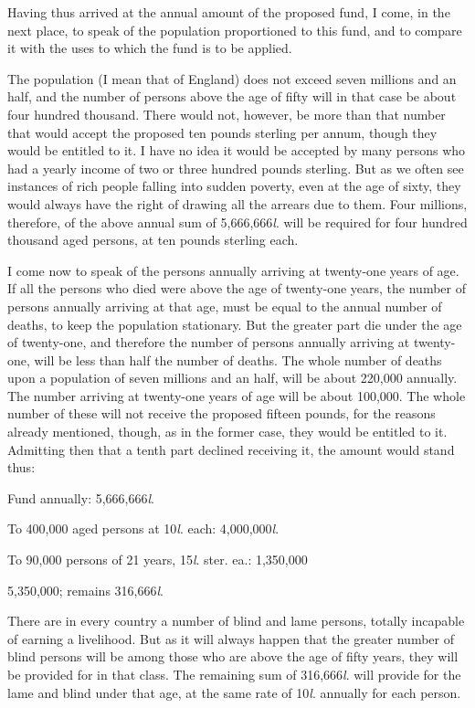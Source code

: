 Having thus arrived at the annual amount of the proposed fund, I come, in the next place, to speak of the population proportioned to this fund, and to compare it with the uses to which the fund is to be applied.

The population (I mean that of England) does not exceed seven millions and an half, and the number of persons above the age of fifty will in that case be about four hundred thousand. There would not, however, be more than that number that would accept the proposed ten pounds sterling per annum, though they would be entitled to it. I have no idea it would be accepted by many persons who had a yearly income of two or three hundred pounds sterling. But as we often see instances of rich people falling into sudden poverty, even at the age of sixty, they would always have the right of drawing all the arrears due to them. Four millions, therefore, of the above annual sum of 5,666,666\emph{l}. will be required for four hundred thousand aged persons, at ten pounds sterling each.

I come now to speak of the persons annually arriving at twenty-one years of age. If all the persons who died were above the age of twenty-one years, the number of persons annually arriving at that age, must be equal to the annual number of deaths, to keep the population stationary. But the greater part die under the age of twenty-one, and therefore the number of persons annually arriving at twenty-one, will be less than half the number of deaths. The whole number of deaths upon a population of seven millions and an half, will be about 220,000 annually. The number arriving at twenty-one years of age will be about 100,000. The whole number of these will not receive the proposed fifteen pounds, for the reasons already mentioned, though, as in the former case, they would be entitled to it. Admitting then that a tenth part declined receiving it, the amount would stand thus:

Fund annually: 5,666,666\emph{l}.

To 400,000 aged persons at 10\emph{l}. each: 4,000,000\emph{l}.

To 90,000 persons of 21 years, 15\emph{l}. ster. ea.: 1,350,000

5,350,000; remains 316,666\emph{l}.

There are in every country a number of blind and lame persons, totally incapable of earning a livelihood. But as it will always happen that the greater number of blind persons will be among those who are above the age of fifty years, they will be provided for in that class. The remaining sum of 316,666\emph{l}. will provide for the lame and blind under that age, at the same rate of 10\emph{l}. annually for each person.

